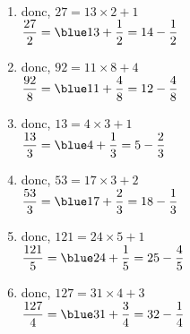 \begin{colonne*exercice}
\begin{corrige}
   \ \\ [-5mm]
   \begin{enumerate}
      \item {} donc, $27 =13\times2+1$ \\ [1mm]
         $\dfrac{27}2 =\blue 13+\dfrac12 =14-\dfrac12$ \medskip
      \item {} donc, $92 =11\times8+4$ \\ [1mm]
         $\dfrac{92}8 =\blue 11+\dfrac48 =12-\dfrac48$ \medskip
      \item {} donc, $13 =4\times3+1$ \\ [1mm]
         $\dfrac{13}{3} =\blue 4+\dfrac13 =5-\dfrac23$ \medskip
      \item {} donc, $53 =17\times3+2$ \\ [1mm]
         $\dfrac{53}{3} =\blue 17+\dfrac23 =18-\dfrac13$ \medskip
      \item {} donc, $121 =24\times5+1$ \\ [1mm]
         $\dfrac{121}{5} =\blue 24+\dfrac15 =25-\dfrac45$ \medskip
      \item {} donc, $127 =31\times4+3$ \\ [1mm]
         $\dfrac{127}{4} =\blue 31+\dfrac34 =32-\dfrac14$
   \end{enumerate}
\end{corrige}

\bigskip



\smallskip


\end{colonne*exercice}
